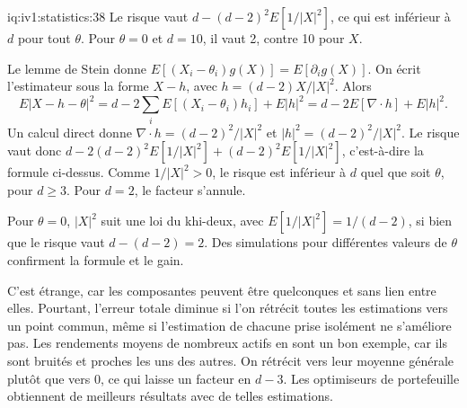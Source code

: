 \begin{solution}{iq:iv1:statistics:38}
Le risque vaut $d - (d - 2)^2 E[1/|X|^2]$, ce qui est inférieur à $d$ pour tout $\theta$. Pour $\theta = 0$ et $d = 10$, il vaut 2, contre 10 pour $X$.

Le lemme de Stein donne $E[(X_i - \theta_i)g(X)] = E[\partial_i g(X)]$. On écrit l'estimateur sous la forme $X - h$, avec $h = (d - 2)X/|X|^2$. Alors
\[
E|X - h - \theta|^2 = d - 2\sum_i E[(X_i - \theta_i)h_i] + E|h|^2 = d - 2E[\nabla \cdot h] + E|h|^2.
\]
Un calcul direct donne $\nabla \cdot h = (d - 2)^2/|X|^2$ et $|h|^2 = (d - 2)^2/|X|^2$. Le risque vaut donc $d - 2(d - 2)^2 E[1/|X|^2] + (d - 2)^2 E[1/|X|^2]$, c'est-à-dire la formule ci-dessus. Comme $1/|X|^2 > 0$, le risque est inférieur à $d$ quel que soit $\theta$, pour $d \ge 3$. Pour $d = 2$, le facteur s'annule.

Pour $\theta = 0$, $|X|^2$ suit une loi du khi-deux, avec $E[1/|X|^2] = 1/(d - 2)$, si bien que le risque vaut $d - (d - 2) = 2$. Des simulations pour différentes valeurs de $\theta$ confirment la formule et le gain.

C'est étrange, car les composantes peuvent être quelconques et sans lien entre elles. Pourtant, l'erreur totale diminue si l'on rétrécit toutes les estimations vers un point commun, même si l'estimation de chacune prise isolément ne s'améliore pas. Les rendements moyens de nombreux actifs en sont un bon exemple, car ils sont bruités et proches les uns des autres. On rétrécit vers leur moyenne générale plutôt que vers 0, ce qui laisse un facteur en $d - 3$. Les optimiseurs de portefeuille obtiennent de meilleurs résultats avec de telles estimations.

\end{solution}

